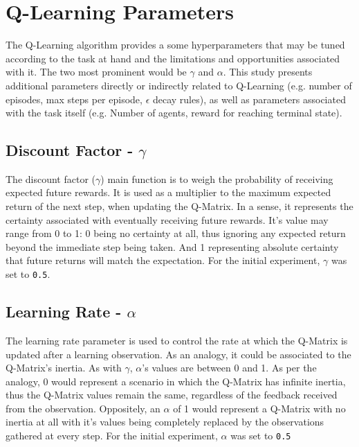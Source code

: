 \documentclass[11pt]{article}
\begin{document}
\section{Q-Learning Parameters}\label{sec:params}
    The Q-Learning algorithm provides a some hyperparameters that may be tuned according to the task at hand and the limitations and opportunities associated with it. The two most prominent would be $\gamma$ and $\alpha$. This study presents additional parameters directly or indirectly related to Q-Learning (e.g. number of episodes, max steps per episode, $\epsilon$ decay rules), as well as parameters associated with the task itself (e.g. Number of agents, reward for reaching terminal state).

    \subsection{Discount Factor - $\gamma$}
        The discount factor ($\gamma$) main function is to weigh the probability of receiving expected future rewards. It is used as a multiplier to the maximum expected return of the next step, when updating the Q-Matrix. In a sense, it represents the certainty associated with eventually receiving future rewards. It's value may range from 0 to 1: 0 being no certainty at all, thus ignoring any expected return beyond the immediate step being taken. And 1 representing absolute certainty that future returns will match the expectation. For the initial experiment, $\gamma$ was set to \texttt{0.5}.

    \subsection{Learning Rate - $\alpha$}
        The learning rate parameter is used to control the rate at which the Q-Matrix is updated after a learning observation. As an analogy, it could be associated to the Q-Matrix's inertia. As with $\gamma$, $\alpha$'s values are between 0 and 1. As per the analogy, 0 would represent a scenario in which the Q-Matrix has infinite inertia, thus the Q-Matrix values remain the same, regardless of the feedback received from the observation. Oppositely, an $\alpha$ of 1 would represent a Q-Matrix with no inertia at all with it's values being completely replaced by the observations gathered at every step. For the initial experiment, $\alpha$ was set to \texttt{0.5}
\end{document}

